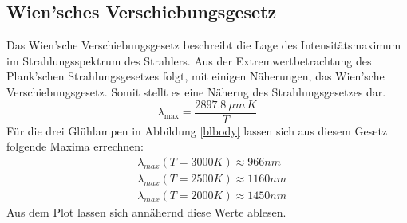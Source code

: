 \subsection*{Wien'sches Verschiebungsgesetz}
Das Wien'sche Verschiebungsgesetz beschreibt die Lage des Intensitätsmaximum im Strahlungsspektrum des Strahlers. Aus der Extremwertbetrachtung des Plank'schen Strahlungsgesetzes folgt, mit einigen Näherungen, das Wien'sche Verschiebungsgesetz. Somit stellt es eine Näherng des Strahlungsgesetzes dar.
\[ \lambda_{\text{max}} = \frac{\SI{2897,8}{\mu m} \, K}{T} \]
Für die drei Glühlampen in Abbildung \ref{blbody} lassen sich aus diesem Gesetz folgende Maxima errechnen:
\begin{align*}
	&\lambda_{max} (T=3000K) \approx 966 nm\\
	&\lambda_{max} (T=2500K) \approx 1160 nm\\
	&\lambda_{max} (T=2000K) \approx 1450 nm
\end{align*}
Aus dem Plot lassen sich annähernd diese Werte ablesen.
